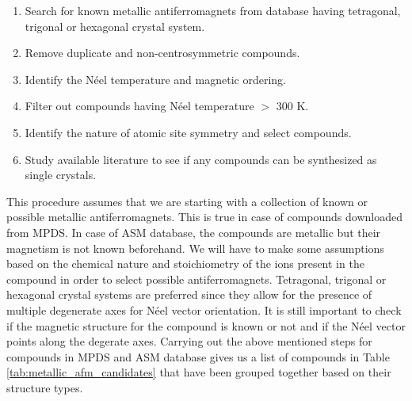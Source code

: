 \documentclass[10pt,doublespacing,edeposit]{uiucthesis2020}
\begin{document}
\begin{mainmatter}
\begin{enumerate}
\item Search for known metallic antiferromagnets from database having tetragonal, trigonal or hexagonal crystal system.
\item Remove duplicate and non-centrosymmetric compounds.
\item Identify the Néel temperature and magnetic ordering.
\item Filter out compounds having Néel temperature $>$ 300 K.
\item Identify the nature of atomic site symmetry and select compounds.
\item Study available literature to see if any compounds can be synthesized as single crystals.
\end{enumerate}

This procedure assumes that we are starting with a collection of known or possible metallic antiferromagnets. This is true in case of compounds downloaded from MPDS. In case of ASM database, the compounds are metallic but their magnetism is not known beforehand. We will have to make some assumptions based on the chemical nature and stoichiometry of the ions present in the compound in order to select possible antiferromagnets. Tetragonal, trigonal or hexagonal crystal systems are preferred since they allow for the presence of multiple degenerate axes for N\'eel vector orientation. It is still important to check if the magnetic structure for the compound is known or not and if the N\'eel vector points along the degerate axes. Carrying out the above mentioned steps for compounds in MPDS and ASM database gives us a list of compounds  in Table \ref{tab:metallic_afm_candidates} that have been grouped together based on their structure types.


\end{mainmatter}
\end{document}
